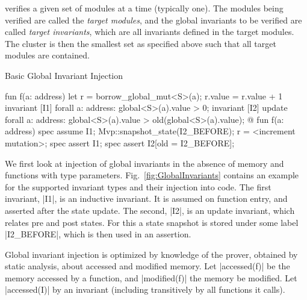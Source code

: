 
\MVP verifies a given set of modules at a time (typically one).  The modules
being verified are called the \textit{target modules}, and the global invariants
to be verified are called \textit{target invariants}, which are all invariants
defined in the target modules. The cluster is then the smallest set as specified
above such that all target modules are contained.


\begin{Figure}
  \caption{Basic Global Invariant Injection}
  \label{fig:GlobalInvariants}
  \centering
\begin{MoveBox}
  fun f(a: address) {
    let r = borrow_global_mut<S>(a);
    r.value = r.value + 1
  }
  invariant [I1] forall a: address: global<S>(a).value > 0;
  invariant [I2] update forall a: address:
      global<S>(a).value > old(global<S>(a).value);
  @\transform@
  fun f(a: address) {
    spec assume I1;
    Mvp::snapshot_state(I2_BEFORE);
    r = <increment mutation>;
    spec assert I1;
    spec assert I2[old = I2_BEFORE];
  }
\end{MoveBox}
\end{Figure}


We first look at injection of global invariants in the absence of memory and
functions with type parameters. Fig.~\ref{fig:GlobalInvariants} contains an
example for the supported invariant types and their injection into code. The
first invariant, |I1|, is an inductive invariant. It is assumed on function
entry, and asserted after the state update. The second, |I2|, is an update
invariant, which relates pre and post states. For this a state snapshot is
stored under some label |I2_BEFORE|, which is then used in an assertion.

Global invariant injection is optimized by knowledge of the prover, obtained by
static analysis, about accessed and modified memory.  Let |accessed(f)| be the
memory accessed by a function, and |modified(f)| the memory be modified. Let
|accessed(I)| by an invariant (including transitively by all functions it
calls).

